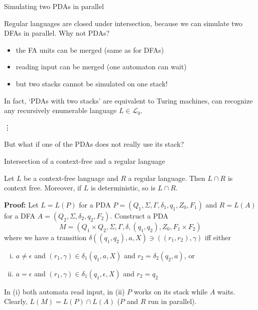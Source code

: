 \documentclass[handout]{beamer}
\begin{document}
\begin{frame}{Simulating two PDAs in parallel}

    Regular languages are closed under intersection, because we can simulate two DFAs in parallel. Why not PDAs?

    \begin{itemize}
        \item the FA units can be merged (same as for DFAs)
        \item reading input can be merged (one automaton can wait)
        \item but two stacks cannot be simulated on one stack!
    \end{itemize}
        
    In fact, `PDAs with two stacks' are equivalent to \alert{Turing machines}, can recognize any \alert{recursively enumerable} language $L\in{\mathcal L}_0$.

    \medskip
    \vdots
    \medskip

    But what if one of the PDAs does not really use its stack?

\end{frame}


\begin{frame}{Intersection of a context-free and a regular language}

    \begin{theorem}
        Let $L$ be a context-free language and $R$ a regular language. Then $L\cap R$ is context free. Moreover, if $L$ is deterministic, so is $L\cap R$.
    \end{theorem}

    \textbf{Proof:} Let $L=L(P)$ for a PDA $P=(Q_1,\Sigma,\Gamma,\delta_1,q_1,Z_0,F_1)$ and $R=L(A)$ for a DFA $A=(Q_2,\Sigma,\delta_2,q_2,F_2)$. Construct a PDA 
    $$
    M=(Q_1\times Q_2,\Sigma,\Gamma,\delta, (q_1,q_2),Z_0,F_1\times F_2)
    $$ 
    where we have a transition $\delta((q_1,q_2),a,X)\ni((r_1,r_2),\gamma)$ iff either
    \begin{enumerate}[(i)]
        \item $a\neq\epsilon$ and $(r_1,\gamma)\in \delta_1(q_1,a,X)$ and $r_2=\delta_2(q_2,a)$, or
        \item $a=\epsilon$ and $(r_1,\gamma)\in \delta_1(q_1,\epsilon,X)$ and $r_2=q_2$
    \end{enumerate}
    In (i) both automata read input, in (ii) $P$ works on its stack while $A$ waits. Clearly, $L(M)=L(P)\cap L(A)$ ($P$ and $R$ run in parallel).\hfill\qedsymbol       

\end{frame}
\end{document}
